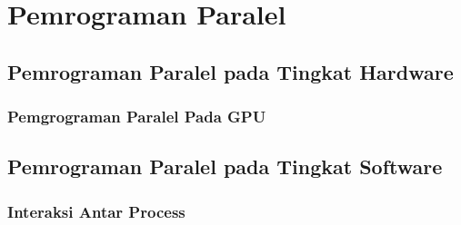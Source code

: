\section{Pemrograman Paralel}
\subsection{Pemrograman Paralel pada Tingkat Hardware}
\subsubsection{Pemgrograman Paralel Pada GPU}
\subsection{Pemrograman Paralel pada Tingkat Software}
\subsubsection{Interaksi Antar Process}
